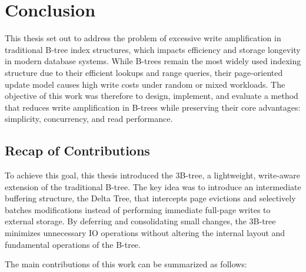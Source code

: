 \chapter{Conclusion}

This thesis set out to address the problem of excessive write amplification in traditional B-tree index structures, which impacts efficiency and storage longevity in modern database systems. 
While B-trees remain the most widely used indexing structure due to their efficient lookups and range queries, their page-oriented update model causes high write costs under random or mixed workloads. 
The objective of this work was therefore to design, implement, and evaluate a method that reduces write amplification in B-trees while preserving their core advantages: simplicity, concurrency, and read performance.

\section{Recap of Contributions}

To achieve this goal, this thesis introduced the 3B-tree, a lightweight, write-aware extension of the traditional B-tree.
The key idea was to introduce an intermediate buffering structure, the Delta Tree, that intercepts page evictions and selectively batches modifications instead of performing immediate full-page writes to external storage. 
By deferring and consolidating small changes, the 3B-tree minimizes unnecessary \ac{IO} operations without altering the internal layout and fundamental operations of the B-tree.

The main contributions of this work can be summarized as follows:

